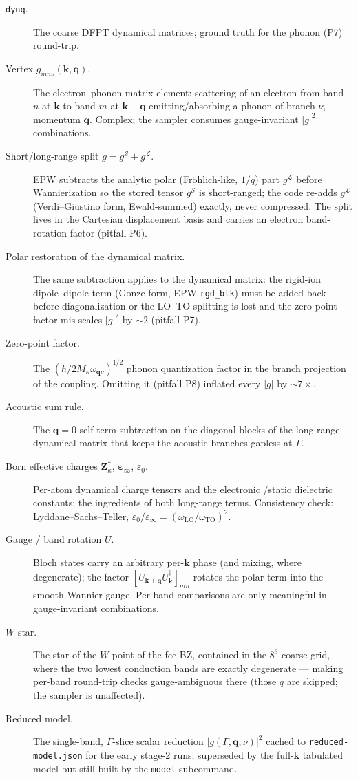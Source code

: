 \documentclass[11pt]{article}
\newcommand{\kv}{\mathbf{k}}
\newcommand{\qv}{\mathbf{q}}
\newcommand{\term}[1]{\item[#1.]}
\begin{document}
\begin{description}
\term{\texttt{dynq}} The coarse DFPT dynamical matrices; ground truth for the phonon
  (P7) round-trip.

\term{Vertex $g_{mn\nu}(\kv,\qv)$} The electron--phonon matrix element: scattering of
  an electron from band $n$ at $\kv$ to band $m$ at $\kv+\qv$ emitting/absorbing a
  phonon of branch $\nu$, momentum $\qv$. Complex; the sampler consumes
  gauge-invariant $|g|^{2}$ combinations.

\term{Short/long-range split $g=g^{\mathcal S}+g^{\mathcal L}$} EPW subtracts the
  analytic polar (Fr\"ohlich-like, $1/q$) part $g^{\mathcal L}$ before Wannierization
  so the stored tensor $g^{\mathcal S}$ is short-ranged; the code re-adds
  $g^{\mathcal L}$ (Verdi--Giustino form, Ewald-summed) exactly, never compressed.
  The split lives in the Cartesian displacement basis and carries an electron
  band-rotation factor (pitfall P6).

\term{Polar restoration of the dynamical matrix} The same subtraction applies to the
  dynamical matrix: the rigid-ion dipole--dipole term (Gonze form, EPW
  \texttt{rgd\_blk}) must be added back before diagonalization or the LO--TO
  splitting is lost and the zero-point factor mis-scales $|g|^{2}$ by $\sim2$
  (pitfall P7).

\term{Zero-point factor} The $(\hbar/2M_{\kappa}\omega_{\qv\nu})^{1/2}$ phonon
  quantization factor in the branch projection of the coupling. Omitting it (pitfall
  P8) inflated every $|g|$ by $\sim7\times$.

\term{Acoustic sum rule} The $\qv=0$ self-term subtraction on the diagonal blocks of
  the long-range dynamical matrix that keeps the acoustic branches gapless at
  $\Gamma$.

\term{Born effective charges $\mathbf{Z}^{*}_{\kappa}$, $\bm\varepsilon_{\infty}$,
  $\varepsilon_{0}$} Per-atom dynamical charge tensors and the electronic /static
  dielectric constants; the ingredients of both long-range terms. Consistency check:
  Lyddane--Sachs--Teller,
  $\varepsilon_{0}/\varepsilon_{\infty}=(\omega_{\mathrm{LO}}/\omega_{\mathrm{TO}})^{2}$.

\term{Gauge / band rotation $U$} Bloch states carry an arbitrary per-$\kv$ phase (and
  mixing, where degenerate); the factor $[U_{\kv+\qv}U^{\dagger}_{\kv}]_{mn}$ rotates
  the polar term into the smooth Wannier gauge. Per-band comparisons are only
  meaningful in gauge-invariant combinations.

\term{$W$ star} The star of the $W$ point of the fcc BZ, contained in the $8^{3}$
  coarse grid, where the two lowest conduction bands are exactly degenerate --- making
  per-band round-trip checks gauge-ambiguous there (those $q$ are skipped; the
  sampler is unaffected).

\term{Reduced model} The single-band, $\Gamma$-slice scalar reduction
  $|g(\Gamma,\qv,\nu)|^{2}$ cached to \texttt{reduced-model.json} for the early
  stage-2 runs; superseded by the full-$\kv$ tabulated model but still built by the
  \texttt{model} subcommand.
\end{description}
\end{document}
